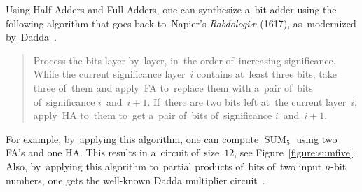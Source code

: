 \documentclass[sigconf, review, anonymous]{acmart}
\DeclareMathOperator{\SUM}{SUM}
\begin{document}
Using Half Adders and Full Adders, one can synthesize a~bit adder using the following algorithm that goes back to~Napier's \emph{Rabdologiæ} (1617),
as~modernized by~Dadda~\cite{dadda}.
\begin{quote}
	Process the bits layer by~layer, in~the order of~increasing significance.
	While the current significance layer~$i$ contains at~least three bits,
	take three of~them and apply~FA to~replace them with a~pair of~bits
	of~significance $i$~and~$i+1$. If~there are two bits left at~the current layer~$i$, apply~HA to~them to~get a~pair of~bits of~significance $i$~and~$i+1$.
\end{quote}
For example, by~applying this algorithm, one can compute $\SUM_5$ using two FA's and one HA. This results in a~circuit of~size~$12$, see Figure~\ref{figure:sumfive}. Also, by~applying this algorithm to~partial products of~bits of~two input $n$-bit numbers, one gets the well-known Dadda multiplier circuit~\cite{dadda}.
\end{document}
